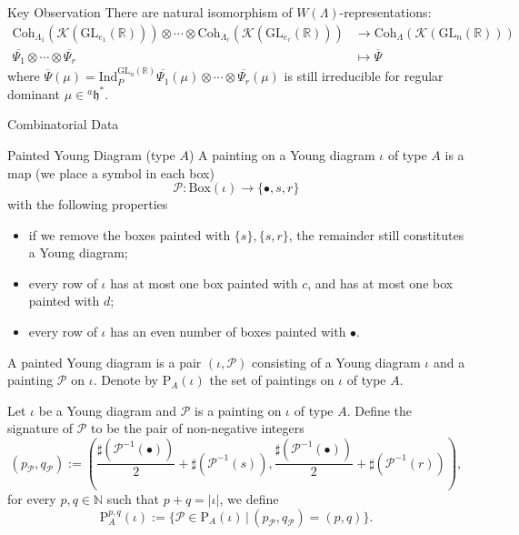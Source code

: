 \documentclass[fleqn,xcolor=dvipsnames]{beamer}
\newcommand{\BN}{{\mathbb {N}}}
\newcommand{\BR}{{\mathbb {R}}}
\newcommand{\CK}{{\mathcal {K}}}
\newcommand{\CP}{{\mathcal {P}}}
\newcommand{\fh}{\mathfrak{h}}
\newcommand{\GL}{{\mathrm{GL}}}
\newcommand{\Ind}{{\mathrm{Ind}}}
\newcommand{\set}[2]{\{#1\,|\,#2\}}
\renewcommand{\bar}{\overline}
\begin{document}
\begin{frame}{Key Observation}
  There are natural isomorphism of $W(\Lambda)$-representations:
  \begin{align*}
    \mathrm{Coh}_{\Lambda_1}(\CK(\GL_{e_1}(\BR))) \otimes \cdots \otimes \mathrm{Coh}_{\Lambda_r}(\CK(\GL_{e_r}(\BR))) &\to \mathrm{Coh}_{\Lambda}(\CK(\GL_{n}(\BR)))\\
    \bar{\Psi_1} \otimes \cdots \otimes \bar{\Psi_r} & \mapsto \bar{\Psi}
  \end{align*}
  where $\bar{\Psi}(\mu) = \Ind_{P}^{\GL_{n}(\BR)}\bar{\Psi_1}(\mu) \otimes \cdots \otimes \bar{\Psi_r}(\mu)$ is still irreducible for regular dominant $\mu \in {^{a}\fh}^*$.
\end{frame}


\begin{frame}{Combinatorial Data}
  \begin{block}{Painted Young Diagram (type $A$)}
    A painting on a Young diagram $\iota$ of type $A$ is a map (we place a symbol in each box)
   $$\CP : \mathrm{Box}(\iota) \to \{ \bullet, s ,r \}$$
   with the following properties

   \begin{itemize}
      \item if we remove the boxes painted with $\{s\}, \{s,r\}$, the remainder still constitutes a Young diagram;
      \item every row of $\iota$ has at most one box painted with $c$, and has at most one box painted with $d$;
      \item every row of $\iota$ has an even number of boxes painted with $\bullet$.
   \end{itemize}
   A painted Young diagram is a pair $(\iota, \CP)$ consisting of a Young diagram $\iota$ and a painting $\CP$ on $\iota$. Denote by $\mathrm{P}_{A}(\iota)$ the set of paintings on $\iota$ of type $A$.
    
  \end{block}
\end{frame}






\begin{frame}
  Let $\iota$ be a Young diagram and $\CP$ is a painting on $\iota$ of type $A$. Define the signature of $\CP$ to be the pair of non-negative integers
   \begin{equation*}
    \left(p_{\CP}, q_{\CP}\right) := \left(\frac{\sharp(\CP^{-1}(\bullet))}{2} + \sharp(\CP^{-1}(s)), \frac{\sharp(\CP^{-1}(\bullet))}{2}+ \sharp(\CP^{-1}(r))\right),
   \end{equation*}
   for every $p,q \in \BN$ such that $p + q = |\iota|$, we define
   \begin{equation*}
        \mathrm{P}_{A}^{p,q}(\iota) := \set{\CP \in \mathrm{P}_{A}(\iota)}{(p_{\CP},q_{\CP}) = (p,q)}.       
   \end{equation*}
\end{frame}
\end{document}

